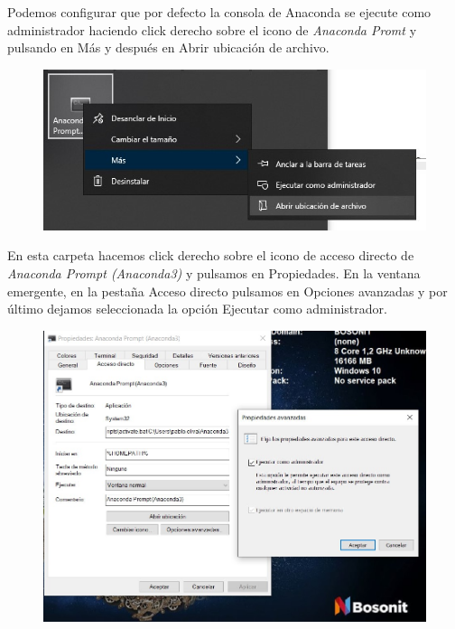 \documentclass[a4paper,10pt]{article}
\begin{document}
Podemos configurar que por defecto la consola de Anaconda se ejecute como administrador haciendo click derecho sobre el icono de \textit{Anaconda Promt} y pulsando en Más y después en Abrir ubicación de archivo.

\begin{figure}[H]
\begin{center}
\includegraphics[width=450pt]{./fotos/introduccion/2b - anaconda.jpg}
\end{center}
\end{figure}

En esta carpeta hacemos click derecho sobre el icono de acceso directo de \textit{Anaconda Prompt (Anaconda3)} y pulsamos en Propiedades. En la ventana emergente, en la pestaña Acceso directo pulsamos en Opciones avanzadas y por último dejamos seleccionada la opción Ejecutar como administrador.

\begin{figure}[H]
\begin{center}
\includegraphics[width=450pt]{./fotos/introduccion/3b - anaconda (V).jpg}
\end{center}
\end{figure}
\end{document}
